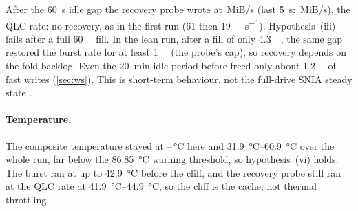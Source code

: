 After the \qty{60}{\second} idle gap the recovery probe wrote at
\,MiB/s (last \qty{5}{\second}:
\,MiB/s), the QLC rate: no recovery, as in the first run
(\qty{61}{} then \qty{19}{\mebi\byte\per\second}). Hypothesis~(iii) fails after a full
\qty{60}{\gibi\byte} fill. In the lean run, after a fill of only \qty{4.3}{\gibi\byte}, the same gap
restored the burst rate for at least \qty{1}{\gibi\byte} (the probe's cap), so recovery depends on the
fold backlog. Even the \qty{20}{\minute} idle period before  freed only about
\qty{1.2}{\gibi\byte} of fast writes (\cref{sec:ws}). This is short-term behaviour, not the full-drive SNIA
steady state \cite{snia_pts}.

\paragraph{Temperature.} The composite temperature stayed at
--\,\si{\celsius} here and
\qtyrange{31.9}{60.9}{\celsius} over the whole run, far below the \qty{86.85}{\celsius} warning threshold,
so hypothesis~(vi) holds. The burst ran at up to \qty{42.9}{\celsius} before the cliff, and the recovery
probe still ran at the QLC rate at \qtyrange{41.9}{44.9}{\celsius}, so the cliff is the cache, not thermal
throttling.

